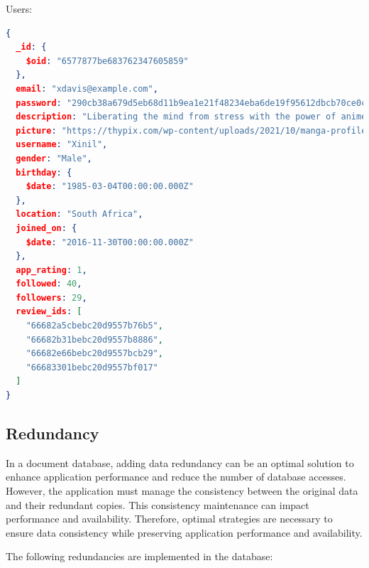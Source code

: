 Users:
\begin{lstlisting}[language=json]
{
  _id: {
    $oid: "6577877be683762347605859"
  },
  email: "xdavis@example.com",
  password: "290cb38a679d5eb68d11b9ea1e21f48234eba6de19f95612dbcb70ce0c7e4e78",
  description: "Liberating the mind from stress with the power of anime zen.",
  picture: "https://thypix.com/wp-content/uploads/2021/10/manga-profile-picture-44.jpg",
  username: "Xinil",
  gender: "Male",
  birthday: {
    $date: "1985-03-04T00:00:00.000Z"
  },
  location: "South Africa",
  joined_on: {
    $date: "2016-11-30T00:00:00.000Z"
  },
  app_rating: 1,
  followed: 40,
  followers: 29,
  review_ids: [
    "66682a5cbebc20d9557b76b5",
    "66682b31bebc20d9557b8886",
    "66682e66bebc20d9557bcb29",
    "66683301bebc20d9557bf017"
  ]
}\end{lstlisting}

\vspace{\baselineskip}

\subsection*{Redundancy}

In a document database, adding data redundancy can be an optimal solution to enhance application performance and reduce the
number of database accesses. However, the application must manage the consistency between the original data
and their redundant copies. This consistency maintenance can impact performance and availability. Therefore,
optimal strategies are necessary to ensure data consistency while preserving application performance and availability.

\vspace{\baselineskip}

The following redundancies are implemented in the database:

\vspace{\baselineskip}

